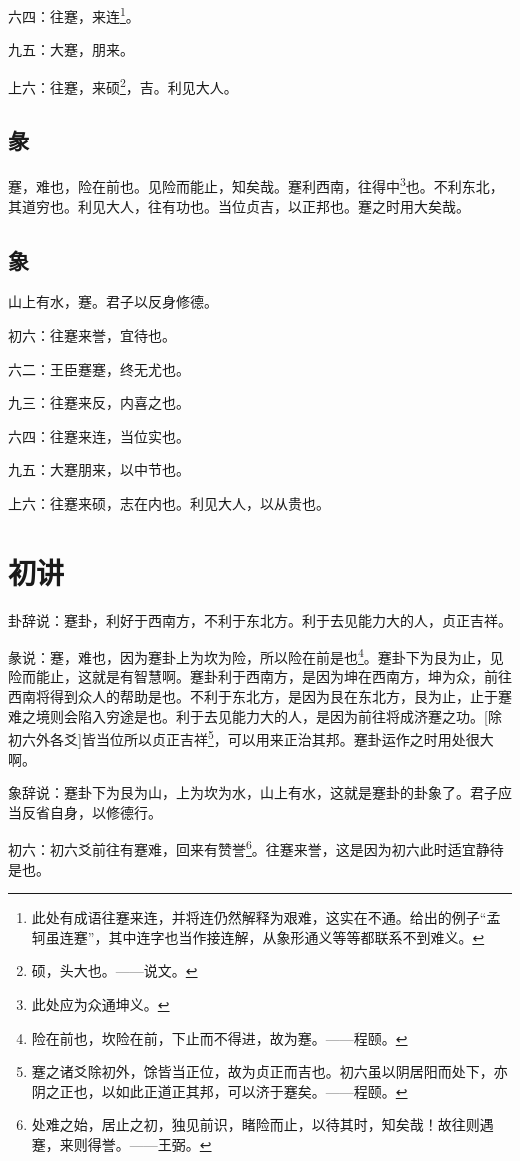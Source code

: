 \documentclass[12pt,oneside]{book}
\begin{document}
六四：往蹇，来连\footnote{此处有成语往蹇来连，并将连仍然解释为艰难，这实在不通。给出的例子“孟轲虽连蹇”，其中连字也当作接连解，从象形通义等等都联系不到难义。}。

九五：大蹇，朋来。

上六：往蹇，来硕\footnote{硕，头大也。——说文。}，吉。利见大人。

\subsection{彖}
蹇，难也，险在前也。见险而能止，知矣哉。蹇利西南，往得中\footnote{此处应为众通坤义。}也。不利东北，其道穷也。利见大人，往有功也。当位贞吉，以正邦也。蹇之时用大矣哉。

\subsection{象}
山上有水，蹇。君子以反身修德。

初六：往蹇来誉，宜待也。

六二：王臣蹇蹇，终无尤也。

九三：往蹇来反，内喜之也。

六四：往蹇来连，当位实也。

九五：大蹇朋来，以中节也。

上六：往蹇来硕，志在内也。利见大人，以从贵也。

\section{初讲}
卦辞说：蹇卦，利好于西南方，不利于东北方。利于去见能力大的人，贞正吉祥。

彖说：蹇，难也，因为蹇卦上为坎为险，所以险在前是也\footnote{险在前也，坎险在前，下止而不得进，故为蹇。——程颐。}。蹇卦下为艮为止，见险而能止，这就是有智慧啊。蹇卦利于西南方，是因为坤在西南方，坤为众，前往西南将得到众人的帮助是也。不利于东北方，是因为艮在东北方，艮为止，止于蹇难之境则会陷入穷途是也。利于去见能力大的人，是因为前往将成济蹇之功。[除初六外各爻]皆当位所以贞正吉祥\footnote{蹇之诸爻除初外，馀皆当正位，故为贞正而吉也。初六虽以阴居阳而处下，亦阴之正也，以如此正道正其邦，可以济于蹇矣。——程颐。}，可以用来正治其邦。蹇卦运作之时用处很大啊。

象辞说：蹇卦下为艮为山，上为坎为水，山上有水，这就是蹇卦的卦象了。君子应当反省自身，以修德行。

初六：初六爻前往有蹇难，回来有赞誉\footnote{处难之始，居止之初，独见前识，睹险而止，以待其时，知矣哉！故往则遇蹇，来则得誉。——王弼。}。往蹇来誉，这是因为初六此时适宜静待是也。
\end{document}
